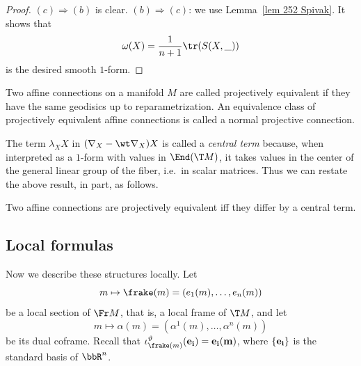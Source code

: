 \begin{proof}
    $(c)\Rightarrow (b)$ is clear. $(b)\Rightarrow(c)$: we use Lemma~\ref{lem 252 Spivak}. It shows that 
    \[\omega(X)=\frac{1}{n+1}\tr (S(X,\_))\]
    is the desired smooth $1$-form.
\end{proof}

\begin{defn}
    Two affine connections on a manifold $M$ are called projectively equivalent if they have the same geodisics up to reparametrization. An equivalence class of projectively equivalent affine connections is called a normal projective connection.
\end{defn}

The term $\lambda_X X$ in $(\nabla_X -\wt\nabla_X)X$ is called a \emph{central term} because, when interpreted as a $1$-form with values in $\End(\T M)$, it takes values in the center of the general linear group of the fiber, i.e.\ in scalar matrices. Thus we can restate the above result, in part, as follows.

\begin{cor}
    Two affine connections are projectively equivalent iff they differ by a central term.
\end{cor}







\subsection{Local formulas}


Now we describe these structures locally. Let
\[m\mapsto \frake(m)=(e_1(m),\ldots,e_n(m))\]
be a local section of $\Fr M$, that is, a local frame of $\T M$, and let 
\[m\mapsto \alpha(m)=(\alpha^1(m),\ldots,\alpha^n(m))\]
be its dual coframe. Recall that $\iota^\vartheta_{\frake(m)}(\bf{e}_i)=e_i(m)$, where $\{\bf{e}_i\}$ is the standard basis of $\bbR^n$.

